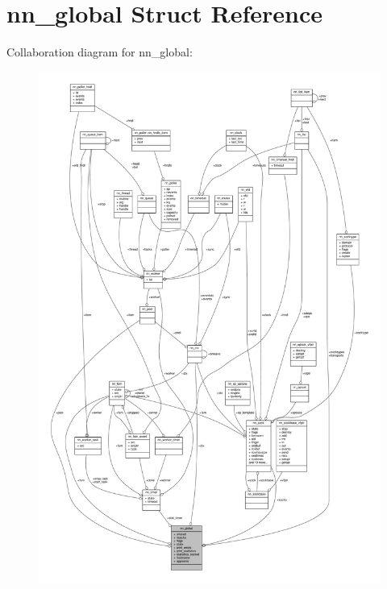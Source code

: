 \hypertarget{structnn__global}{}\section{nn\+\_\+global Struct Reference}
\label{structnn__global}


Collaboration diagram for nn\+\_\+global\+:\nopagebreak
\begin{figure}[H]
\begin{center}
\leavevmode
\includegraphics[width=350pt]{structnn__global__coll__graph}
\end{center}
\end{figure}
